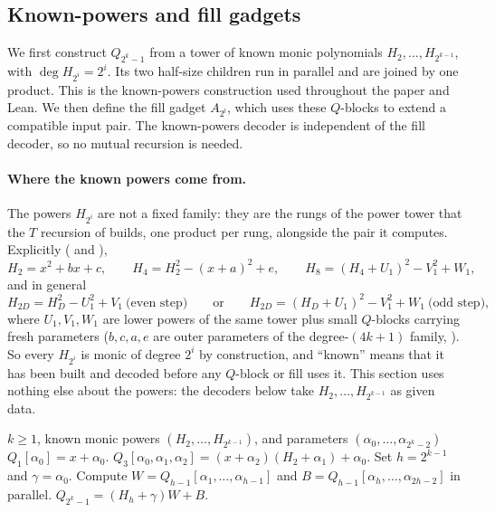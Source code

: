 \subsection{Known-powers and fill gadgets}
\label{sec:peeled-Q}

We first construct $Q_{2^k-1}$ from a tower of known monic polynomials
$H_2,\ldots,H_{2^{k-1}}$, with $\deg H_{2^i}=2^i$.
Its two half-size children run in parallel and are joined by one product.
This is the known-powers construction used throughout the paper and Lean.
We then define the fill gadget $A_{2^l}$, which uses these $Q$-blocks to
extend a compatible input pair.  The known-powers decoder is independent
of the fill decoder, so no mutual recursion is needed.

\paragraph{Where the known powers come from.}
The powers $H_{2^i}$ are not a fixed family: they are the rungs of the power
tower that the $T$ recursion of  builds, one product
per rung, alongside the pair it computes.  Explicitly (
and ),
\[
  H_2=x^2+bx+c,\qquad
  H_4=H_2^2-(x+a)^2+e,\qquad
  H_8=(H_4+U_1)^2-V_1^2+W_1,
\]
and in general
\[
  H_{2D}=H_D^2-U_1^2+V_1\ \text{(even step)}\qquad\text{or}\qquad
  H_{2D}=(H_D+U_1)^2-V_1^2+W_1\ \text{(odd step)},
\]
where $U_1,V_1,W_1$ are lower powers of the same tower plus small
$Q$-blocks carrying fresh parameters ($b,c,a,e$ are outer parameters of the
degree-$(4k+1)$ family, ).  So every $H_{2^i}$ is
monic of degree $2^i$ by construction, and ``known'' means that it has been
built and decoded before any $Q$-block or fill uses it.  This section uses
nothing else about the powers: the decoders below take $H_2,\ldots,H_{2^{k-1}}$
as given data.

\begin{algorithm}[H]
  \caption{Known-powers construction (binary recursion)}\label{alg:constr-known-2n-1}
  \begin{algorithmic}
    \Require $k\ge1$, known monic powers $(H_2,\ldots,H_{2^{k-1}})$,
      and parameters $(\alpha_0,\ldots,\alpha_{2^k-2})$
      \State $Q_1[\alpha_0]=x+\alpha_0$.
      \State $Q_3[\alpha_0,\alpha_1,\alpha_2]=(x+\alpha_2)(H_2+\alpha_1)+\alpha_0$.
    \Else
      \State Set $h=2^{k-1}$ and $\gamma=\alpha_0$.
      \State Compute $W=Q_{h-1}[\alpha_1,\ldots,\alpha_{h-1}]$ and
        $B=Q_{h-1}[\alpha_h,\ldots,\alpha_{2h-2}]$ in parallel.
      \State $Q_{2^k-1}=(H_h+\gamma)W+B$.
    \EndIf
  \end{algorithmic}
\end{algorithm}

